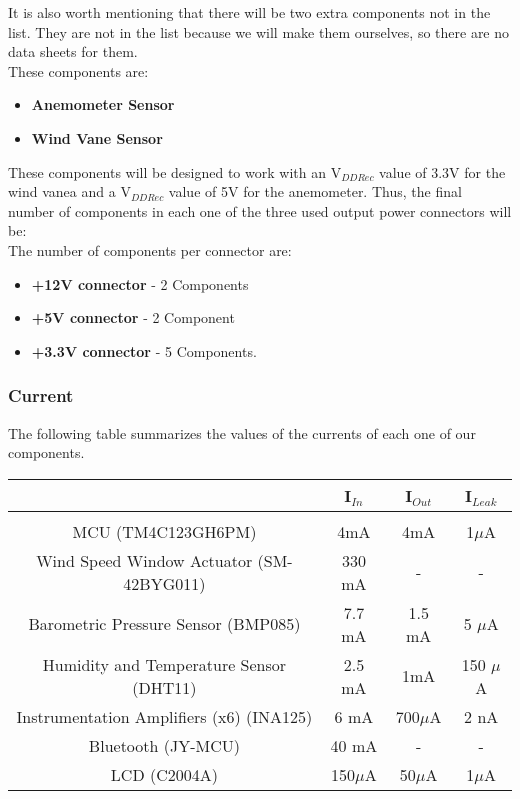 			It is also worth mentioning that there will be two extra components not in the list. They are not in the list because we will make them ourselves, so there are no data sheets for them. \\ 

			These components are: 
			\begin{itemize}
			  \item \textbf{Anemometer Sensor}
			  \item \textbf{Wind Vane Sensor}
			\end{itemize}  

			These components will be designed to work with an V$_{DD Rec}$ value of 3.3V for the wind vanea and a V$_{DD Rec}$ value of 5V for the anemometer. Thus, the final number of components in each one of the three used output power connectors will be: \\

			The number of components per connector are: 
			\begin{itemize}
			  \item \textbf{+12V connector} - 2 Components
			  \item \textbf{+5V connector} - 2 Component
			  \item \textbf{+3.3V connector} - 5 Components.
			\end{itemize} 

		\subsubsection{Current}

			The following table summarizes the values of the currents of each one of our components. 

			\begin{tabular}{|c|c|c|c|}
				\hline
				& I$_{In}$ &  I$_{Out}$ & I$_{Leak}$\\
				\hline
				& & &   \\
				MCU (TM4C123GH6PM) & 4mA & 4mA & 1$\mu$A  \\
				Wind Speed Window Actuator (SM-42BYG011) & 330 mA & - & -\\
				Barometric Pressure Sensor (BMP085) & 7.7 mA  & 1.5 mA & 5 $\mu$A \\
				Humidity and Temperature Sensor (DHT11) & 2.5 mA & 1mA & 150 $\mu$A \\
				Instrumentation Amplifiers (x6) (INA125) & 6 mA &  700$\mu$A & 2 nA  \\
				Bluetooth (JY-MCU) & 40 mA & - & - \\
				LCD (C2004A) & 150$\mu$A & 50$\mu$A & 1$\mu$A \\
				\hline
			\end{tabular} \\ 

